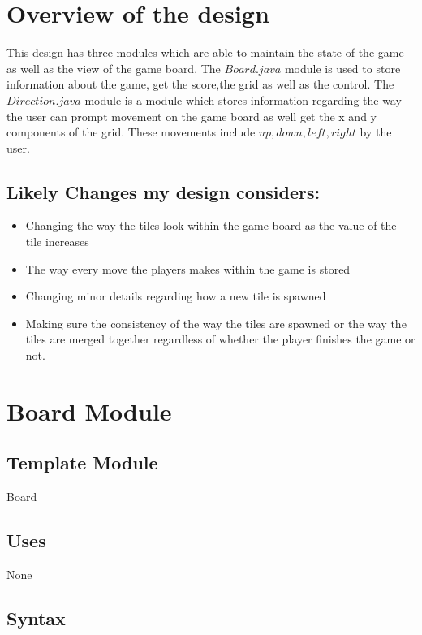 \documentclass[12pt]{article}
\begin{document}
\newpage

\section{Overview of the design}

This design has three modules which are able to maintain the state of the game as well as the view of the game board. The $Board.java$ module is used to 
store information about the game, get the score,the grid as well as the control. The $Direction.java$ module is a module which stores information regarding 
the way the user can prompt movement on the game board as well get the x and y components of the grid. These movements include $up,down,left,right$ by the 
user.

\subsection*{Likely Changes my design considers:}

\begin{itemize}
  \item Changing the way the tiles look within the game board as the value of the tile increases
  \item The way every move the players makes within the game is stored
  \item Changing minor details regarding how a new tile is spawned
  \item Making sure the consistency of the way the tiles are spawned or the way the tiles are merged together 
        regardless of whether the player finishes the game or not.
\end{itemize}

\newpage

\section* {Board Module}

\subsection*{Template Module}

Board

\subsection* {Uses}

None

\subsection* {Syntax}
\end{document}
